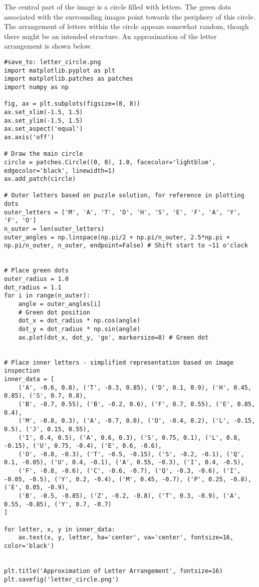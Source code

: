 \documentclass{article}
\begin{document}
The central part of the image is a circle filled with letters. The green dots associated with the surrounding images point towards the periphery of this circle. The arrangement of letters within the circle appears somewhat random, though there might be an intended structure. An approximation of the letter arrangement is shown below.

\begin{verbatim}
#save_to: letter_circle.png
import matplotlib.pyplot as plt
import matplotlib.patches as patches
import numpy as np

fig, ax = plt.subplots(figsize=(8, 8))
ax.set_xlim(-1.5, 1.5)
ax.set_ylim(-1.5, 1.5)
ax.set_aspect('equal')
ax.axis('off')

# Draw the main circle
circle = patches.Circle((0, 0), 1.0, facecolor='lightblue', edgecolor='black', linewidth=1)
ax.add_patch(circle)

# Outer letters based on puzzle solution, for reference in plotting dots
outer_letters = ['M', 'A', 'T', 'D', 'H', 'S', 'E', 'F', 'A', 'Y', 'F', 'O']
n_outer = len(outer_letters)
outer_angles = np.linspace(np.pi/2 + np.pi/n_outer, 2.5*np.pi + np.pi/n_outer, n_outer, endpoint=False) # Shift start to ~11 o'clock


# Place green dots
outer_radius = 1.0
dot_radius = 1.1
for i in range(n_outer):
    angle = outer_angles[i]
    # Green dot position
    dot_x = dot_radius * np.cos(angle)
    dot_y = dot_radius * np.sin(angle)
    ax.plot(dot_x, dot_y, 'go', markersize=8) # Green dot


# Place inner letters - simplified representation based on image inspection
inner_data = [
    ('A', -0.6, 0.8), ('T', -0.3, 0.85), ('D', 0.1, 0.9), ('H', 0.45, 0.85), ('S', 0.7, 0.8),
    ('B', -0.7, 0.55), ('B', -0.2, 0.6), ('F', 0.7, 0.55), ('E', 0.85, 0.4),
    ('M', -0.8, 0.3), ('A', -0.7, 0.0), ('O', -0.4, 0.2), ('L', -0.15, 0.5), ('J', 0.15, 0.55),
    ('I', 0.4, 0.5), ('A', 0.6, 0.3), ('S', 0.75, 0.1), ('L', 0.8, -0.15), ('U', 0.75, -0.4), ('E', 0.6, -0.6),
    ('O', -0.8, -0.3), ('T', -0.5, -0.15), ('S', -0.2, -0.1), ('Q', 0.1, -0.05), ('U', 0.4, -0.1), ('A', 0.55, -0.3), ('I', 0.4, -0.5),
    ('F', -0.8, -0.6), ('C', -0.6, -0.7), ('Q', -0.3, -0.6), ('I', -0.05, -0.5), ('Y', 0.2, -0.4), ('M', 0.45, -0.7), ('P', 0.25, -0.8), ('E', 0.05, -0.9),
    ('B', -0.5, -0.85), ('Z', -0.2, -0.8), ('T', 0.3, -0.9), ('A', 0.55, -0.85), ('Y', 0.7, -0.7)
]

for letter, x, y in inner_data:
    ax.text(x, y, letter, ha='center', va='center', fontsize=16, color='black')


plt.title('Approximation of Letter Arrangement', fontsize=16)
plt.savefig('letter_circle.png')
\end{verbatim}
\end{document}
